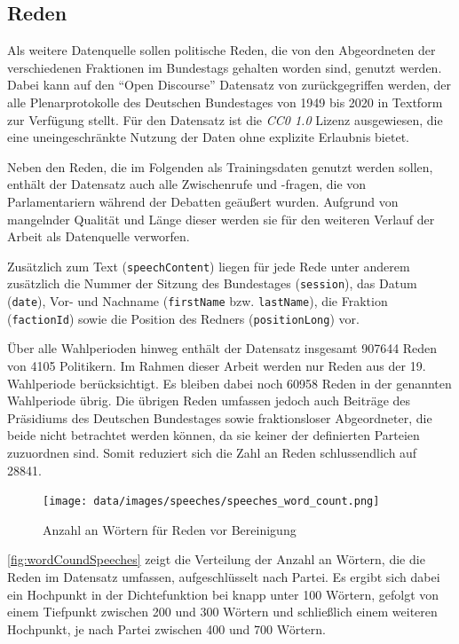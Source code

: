 \subsection*{Reden} \label{subsec:dataUnderstandingReden}

Als weitere Datenquelle sollen politische Reden, die von den Abgeordneten der verschiedenen Fraktionen im Bundestags gehalten worden sind, genutzt werden. Dabei kann auf den \enquote{Open Discourse} Datensatz von \textcite{richter_open_2021} zurückgegriffen werden, der alle Plenarprotokolle des Deutschen Bundestages von \num{1949} bis \num{2020} in Textform zur Verfügung stellt. Für den Datensatz ist die \textit{CC0 1.0} Lizenz ausgewiesen, die eine uneingeschränkte Nutzung der Daten ohne explizite Erlaubnis bietet.

Neben den Reden, die im Folgenden als Trainingsdaten genutzt werden sollen, enthält der Datensatz auch alle Zwischenrufe und -fragen, die von Parlamentariern während der Debatten geäußert wurden. Aufgrund von mangelnder Qualität und Länge dieser werden sie für den weiteren Verlauf der Arbeit als Datenquelle verworfen.

Zusätzlich zum Text (\texttt{speechContent}) liegen für jede Rede unter anderem zusätzlich die Nummer der Sitzung des Bundestages (\texttt{session}), das Datum (\texttt{date}), Vor- und Nachname (\texttt{firstName} bzw. \texttt{lastName}), die Fraktion (\texttt{factionId}) sowie die Position des Redners (\texttt{positionLong}) vor.

Über alle Wahlperioden hinweg enthält der Datensatz insgesamt \num{907644} Reden von \num{4105} Politikern. Im Rahmen dieser Arbeit werden nur Reden aus der 19. Wahlperiode berücksichtigt. Es bleiben dabei noch \num{60958} Reden in der genannten Wahlperiode übrig. Die übrigen Reden umfassen jedoch auch Beiträge des Präsidiums des Deutschen Bundestages sowie fraktionsloser Abgeordneter, die beide nicht betrachtet werden können, da sie keiner der definierten Parteien zuzuordnen sind. Somit reduziert sich die Zahl an Reden schlussendlich auf \num{28841}.


\begin{figure}[H]
    \centering
    \texttt{[image: data/images/speeches/speeches\_word\_count.png]}
    \caption{Anzahl an Wörtern für Reden vor Bereinigung} \label{fig:wordCoundSpeeches}
\end{figure}

\autoref{fig:wordCoundSpeeches} zeigt die Verteilung der Anzahl an Wörtern, die die Reden im Datensatz umfassen, aufgeschlüsselt nach Partei. Es ergibt sich dabei ein Hochpunkt in der Dichtefunktion bei knapp unter 100 Wörtern, gefolgt von einem Tiefpunkt zwischen \num{200} und \num{300} Wörtern und schließlich einem weiteren Hochpunkt, je nach Partei zwischen 400 und 700 Wörtern.

